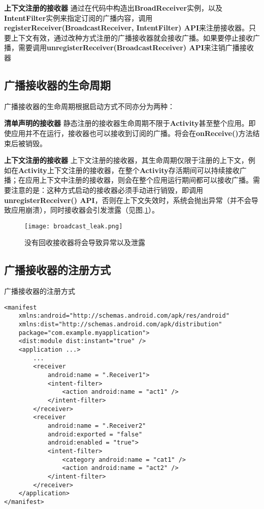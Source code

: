 \textbf{上下文注册的接收器 }\label{declaration:receiver in context} 通过在代码中构造出\textbf{BroadReceiver}实例，以及\textbf{IntentFilter}实例来指定订阅的广播内容，调用\textbf{registerReceiver(BroadcastReceiver, IntentFilter) API}来注册接收器。只要上下文有效，通过改种方式注册的广播接收器就会接收广播。如果要停止接收广播，需要调用\textbf{unregisterReceiver(BroadcastReceiver) API}来注销广播接收器

\subsection{广播接收器的生命周期}

广播接收器的生命周期根据启动方式不同亦分为两种\cite{broadcast}：

\textbf{清单声明的接收器 } 静态注册的接收器生命周期不限于\textbf{Activity}甚至整个应用。即使应用并不在运行，接收器也可以接收到订阅的广播。将会在\textbf{onReceive()}方法结束后被销毁。


\textbf{上下文注册的接收器 } 上下文注册的接收器，其生命周期仅限于注册的上下文，例如在\textbf{Activity}上下文注册的接收器，在整个\textbf{Activity}存活期间可以持续接收广播；在应用上下文中注册的接收器，则会在整个应用运行期间都可以接收广播。需要注意的是：这种方式启动的接收器必须手动进行销毁，即调用\textbf{unregisterReceiver() API}，否则在上下文失效时，系统会抛出异常（并不会导致应用崩溃），同时接收器会引发泄露（见图.\textcolor{red}{\ref{fig:broadcast_leak}}）。

\begin{figure}[htbp]
	\centering
	\texttt{[image: broadcast\_leak.png]} %
	\caption{没有回收接收器将会导致异常以及泄露}
	\label{fig:broadcast_leak}
\end{figure}

\subsection{广播接收器的注册方式}
\begin{listing}[htbp]
	\centering
	\caption{广播接收器的注册方式}
	\begin{verbatim}
<manifest 
	xmlns:android="http://schemas.android.com/apk/res/android"
	xmlns:dist="http://schemas.android.com/apk/distribution"
	package="com.example.myapplication">
	<dist:module dist:instant="true" />
	<application ...>
		...
		<receiver
			android:name = ".Receiver1">
			<intent-filter>
				<action android:name = "act1" />
			</intent-filter>
		</receiver>
		<receiver
			android:name = ".Receiver2"
			android:exported = "false"
			android:enabled = "true">
			<intent-filter>
				<category android:name = "cat1" />
				<action android:name = "act2" />
			</intent-filter>
		</receiver>
	</application>
</manifest>
	\end{verbatim}
	\label{declaration:receiver}
\end{listing}

